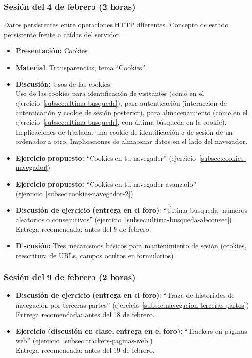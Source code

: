 \documentclass[a4paper,12pt]{article}
\begin{document}
\subsubsection{Sesión del 4 de febrero (2 horas)}

Datos persistentes entre operaciones HTTP diferentes. Concepto de estado persistente frente a caídas del servidor.

\begin{itemize}
\item \textbf{Presentación:} Cookies
\item \textbf{Material:} Transparencias, tema ``Cookies''
\item \textbf{Discusión:} Usos de las cookies. \\
  Uso de las cookies para identificación de visitantes (como en el ejercicio~\ref{subsec:ultima-busqueda}), para autenticación (interacción de autenticación y cookie de sesión posterior), para almacenamiento (como en el ejercicio~\ref{subsec:ultima-busqueda}, con última búsqueda en la cookie). Implicaciones de trasladar una cookie de identificación o de sesión de un ordenador a otro. Implicaciones de almacenar datos en el lado del navegador.
\item \textbf{Ejercicio propuesto:} ``Cookies en tu navegador'' (ejercicio~\ref{subsec:cookies-navegador}) \\
\item \textbf{Ejercicio propuesto:} ``Cookies en tu navegador avanzado'' (ejercicio~\ref{subsec:cookies-navegador-2}) \\
\item \textbf{Discusión de ejercicio (entrega en el foro):} ``Última búsqueda: números aleatorios o consecutivos'' (ejercicio~\ref{subsec:ultima-busqueda-aleconsec}) \\
 Entrega recomendada: antes del 9 de febrero.
\item \textbf{Discusión:} Tres mecanismos básicos para mantenimiento de sesión (cookies, reescritura de URLs, campos ocultos en formularios)
\end{itemize}

\subsubsection{Sesión del 9 de febrero (2 horas)}

\begin{itemize}
\item \textbf{Discusión de ejercicio (entrega en el foro):} ``Traza de historiales de navegación por terceras partes'' (ejercicio~\ref{subsec:navegacion-terceras-partes})  \\
  Entrega recomendada: antes del 18 de febrero.
\item \textbf{Ejercicio (discusión en clase, entrega en el foro):} ``Trackers en páginas web'' (ejercicio~\ref{subsec:trackers-paginas-web})  \\
 Entrega recomendada: antes del 19 de febrero.
\end{itemize}
\end{document}
